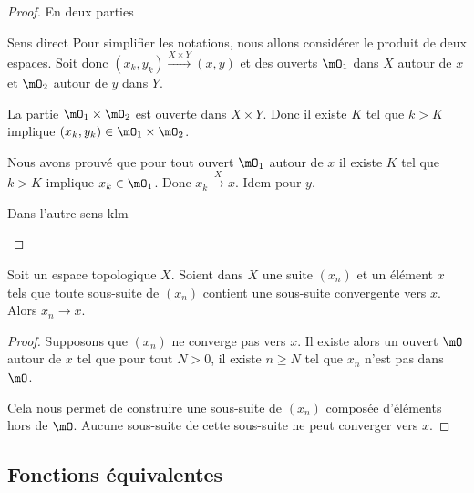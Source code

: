 \begin{proof}
    En deux parties
    \begin{subproof}
        \item[Sens direct]
            Pour simplifier les notations, nous allons considérer le produit de deux espaces. Soit donc \( (x_k,y_k)\stackrel{X\times Y}{\longrightarrow}(x,y)\) et des ouverts \( \mO_1\) dans \( X\) autour de \( x\) et \( \mO_2\) autour de \( y\) dans \( Y\). 

            La partie \( \mO_1\times \mO_2\) est ouverte dans \( X\times Y\). Donc il existe \( K\) tel que \( k>K\) implique \( (x_k,y_k)\in \mO_1\times \mO_2\).

            Nous avons prouvé que pour tout ouvert \( \mO_1\) autour de \( x\) il existe \( K\) tel que \( k>K\) implique \( x_k\in \mO_1\). Donc \( x_k\stackrel{X}{\longrightarrow}x\). Idem pour \( y\).

        \item[Dans l'autre sens]
            klm
    \end{subproof}
\end{proof}

\begin{lemma}        \label{LEMooSJKMooKSiEGq}
    Soit un espace topologique \( X\). Soient dans \( X\) une suite \( (x_n)\) et un élément \( x\) tels que toute sous-suite de \( (x_n)\) contient une sous-suite convergente vers \( x\). Alors \( x_n\to x\).
\end{lemma}

\begin{proof}
    Supposons que \( (x_n)\) ne converge pas vers \( x\). Il existe alors un ouvert \( \mO\) autour de \( x\) tel que pour tout \( N>0\), il existe \( n\geq N\) tel que \( x_n\) n'est pas dans \( \mO\).

    Cela nous permet de construire une sous-suite de \( (x_n)\) composée d'éléments hors de \( \mO\). Aucune sous-suite de cette sous-suite ne peut converger vers \( x\).
\end{proof}

\subsection{Fonctions équivalentes}


